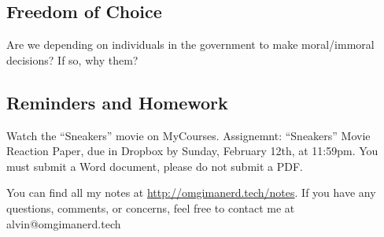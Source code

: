 \documentclass[letterpaper, 12pt]{article}
\begin{document}
\subsection*{Freedom of Choice}
Are we depending on individuals in the government to make moral/immoral
decisions? If so, why them?

\subsection*{Reminders and Homework}
Watch the ``Sneakers'' movie on MyCourses.
Assignemnt: ``Sneakers'' Movie Reaction Paper, due in Dropbox by Sunday,
February 12th, at 11:59pm. You must submit a Word document, please do not
submit a PDF.

\begin{center}
  You can find all my notes at \url{http://omgimanerd.tech/notes}. If you have
  any questions, comments, or concerns, feel free to contact me at
  alvin@omgimanerd.tech
\end{center}
\end{document}

